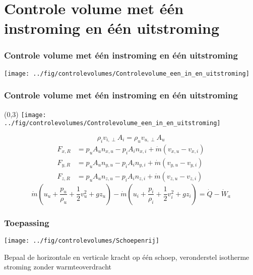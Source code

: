\documentclass[t]{beamer}
\begin{document}
	\section{Controle volume met één instroming en één uitstroming}	
  		\begin{frame}
			\frametitle{Controle volume met één instroming en één uitstroming}
			\vspace{1cm}
			\centering
			\texttt{[image: ../fig/controlevolumes/Controlevolume\_een\_in\_en\_uitstroming]}
		\end{frame}
  		\begin{frame}
			\frametitle{Controle volume met één instroming en één uitstroming}
			\begin{textblock}{5}(0,3)
            	\texttt{[image: ../fig/controlevolumes/Controlevolume\_een\_in\_en\_uitstroming]}
        	\end{textblock}
        	\vspace{2cm}
			\begin{equation}
				\rho_i v_{i,\perp} A_i = \rho_u v_{u,\perp} A_u
				\label{eqn:behoud van massa in een stationair controlevolume met een in en uitstroming}
			\end{equation}
			\pause
			\begin{align}
				F_{x,R} &= p_{u} A_u n_{x,u} - p_{i} A_i n_{x,i} + \dot{m} (v_{x,u}-v_{x,i}) \nonumber \\
				F_{y,R} &= p_{u} A_u n_{y,u} - p_{i} A_i n_{y,i} + \dot{m} (v_{y,u}-v_{y,i}) \\
				F_{z,R} &= p_{u} A_u n_{z,u} - p_{i} A_i n_{z,i} + \dot{m} (v_{z,u}-v_{z,i}) \nonumber
				\label{eqn:behoud van impuls in een stationair controlevolume met een in en uitstroming geprojecteerd2}
			\end{align}
			\pause
			\begin{equation}
				\dot{m} (u_u + \frac{p_u}{\rho_u} + \frac{1}{2}v^2_u + g z_u) - \dot{m} (u_i + \frac{p_i}{\rho_i}+ \frac{1}{2}v^2_i + g z_i) = \dot{Q}-\dot{W}_a
				\label{eqn:behoud van energie in een controlevolume met een in en uitstroming asvermogen}
			\end{equation}
		\end{frame}
		\begin{frame}
			\frametitle{Toepassing}
			\vspace{1cm}
			\centering
			\texttt{[image: ../fig/controlevolumes/Schoepenrij]}
			
			Bepaal de horizontale en verticale kracht op één schoep, veronderstel isotherme stroming zonder warmteoverdracht
		\end{frame}
\end{document}
